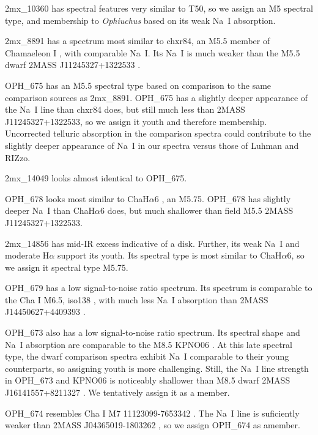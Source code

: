 2mx\_10360 has spectral features very similar to T50, so we assign an M5 spectral type, and membership to \emph{Ophiuchus} based on its weak Na~I absorption.

2mx\_8891 has a spectrum most similar to chxr84, an M5.5 member of Chamaeleon I \citep{2004ApJ...602..816L}, with comparable Na~I.  Its Na~I is much weaker than the M5.5 dwarf 2MASS J11245327+1322533 \citep{2003AJ....126.2421C}.

OPH\_675 has an M5.5 spectral type based on comparison to the same comparison sources as 2mx\_8891.  OPH\_675 has a slightly deeper appearance of the Na~I line than chxr84 does, but still much less than 2MASS J11245327+1322533, so we assign it youth and therefore membership.  Uncorrected telluric absorption in the comparison spectra could contribute to the slightly deeper appearance of Na~I in our spectra versus those of Luhman and RIZzo.  

2mx\_14049 looks almost identical to OPH\_675.

OPH\_678 looks most similar to ChaH$\alpha$6 \citep{2004ApJ...602..816L}, an M5.75.  OPH\_678 has slightly deeper Na~I than ChaH$\alpha$6 does, but much shallower than field M5.5 2MASS J11245327+1322533.  

2mx\_14856 has mid-IR excess indicative of a disk.  Further, its weak Na~I and moderate H$\alpha$ support its youth.  Its spectral type is most similar to ChaH$\alpha$6, so we assign it spectral type M5.75.

OPH\_679 has a low signal-to-noise ratio spectrum.  Its spectrum is comparable to the Cha I M6.5, iso138 \citep{2004ApJ...602..816L}, with much less Na~I absorption than 2MASS J14450627+4409393 \citep{2003AJ....126.2421C}.  

OPH\_673 also has a low signal-to-noise ratio spectrum.  Its spectral shape and Na~I absorption are comparable to the M8.5 KPNO06 \citep{1998AJ....115.2074B,2003ApJ...593.1093L}.  At this late spectral type, the dwarf comparison spectra exhibit Na~I comparable to their young counterparts, so assigning youth is more challenging.  Still, the Na~I line strength in OPH\_673 and KPNO06 is noticeably shallower than M8.5 dwarf 2MASS J16141557+8211327 \citep{2007AJ....133..439C}.  We tentatively assign it as a member.

OPH\_674 resembles Cha I M7 11123099-7653342 \citep{2004ApJ...602..816L}.  The Na~I line is suficiently weaker than 2MASS J04365019-1803262 \citep{2007AJ....133..439C}, so we assign OPH\_674 as amember.  

